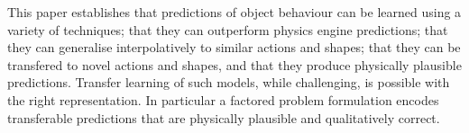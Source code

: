 


This paper establishes that predictions of object behaviour can be learned using a variety of techniques; that they can outperform physics engine predictions; that they can generalise interpolatively to similar actions and shapes; that they can be transfered to novel actions and shapes, and that they produce physically plausible predictions. Transfer learning of such models, while challenging, is possible with the right representation.  In particular a factored problem formulation encodes transferable predictions that are physically plausible and qualitatively correct.